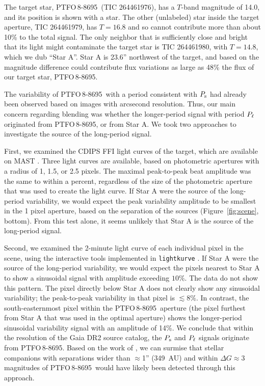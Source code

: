 \documentclass[12pt,twocolumn,tighten]{aastex62}
\newcommand{\ptfo}{PTFO$\,$8-8695}
\begin{document}
The target star, \ptfo\ (TIC 264461976), has a $T$-band magnitude of
14.0, and its position is shown with a star.  The other (unlabeled)
star inside the target aperture, TIC 264461979, has $T=16.8$ and so
cannot contribute more than about 10\% to the total signal.  The only
neighbor that is sufficiently close and bright that its light might
contaminate the target star is TIC 264461980, with $T=14.8$, which we
dub ``Star A''.  Star A is 23.6'' northwest of the target, and based
on the magnitude difference could contribute flux variations as large
as 48\% the flux of our target star, \ptfo.  

The variability of \ptfo\ with a period consistent with $P_{\rm s}$
had already been observed based on images with arcsecond resolution.
Thus, our main concern regarding blending was whether the
longer-period signal with period $P_{\rm \ell}$ originated from \ptfo,
or from Star A. We took two approaches to investigate the source of
the long-period signal.

First, we examined the CDIPS FFI light curves of the target, which are
available on MAST \citep{bouma_cluster_2019}. Three light curves are
available, based on photometric apertures with a radius of 1, 1.5, or
2.5 pixels. The maximal peak-to-peak beat amplitude was the same to
within a percent, regardless of the size of the photometric aperture
that was used to create the light curve.  If Star A were the source of
the long-period variability, we would expect the peak variability
amplitude to be smallest in the 1 pixel aperture, based on the
separation of the sources (Figure~\ref{fig:scene}, bottom).  From this
test alone, it seems unlikely that Star A is the source of the
long-period signal.

Second, we examined the 2-minute light curve of each individual pixel
in the scene, using the interactive tools implemented in
\texttt{lightkurve} \citep{lightkurve_2018}.  If Star A were the
source of the long-period variability, we would expect the pixels
nearest to Star A to show a sinusoidal signal with amplitude exceeding
$10\%$.  The data do not show this pattern.  The pixel directly below
Star A does not clearly show any sinusoidal variability; the
peak-to-peak variability in that pixel is $\lesssim 8\%$.  In
contrast, the south-easternmost pixel within the \ptfo\ aperture (the
pixel furthest from Star A that was used in the optimal aperture)
shows the longer-period sinusoidal variability signal with an
amplitude of 14\%.  We conclude that within the resolution of the Gaia
DR2 source catalog, the $P_{\rm s}$ and $P_{\rm \ell}$ signals
originate from \ptfo.  Based on the work of
\citet{ziegler_measuring_2018}, we can surmise that stellar companions
with separations wider than $\approx$1'' (349~AU) and within $\Delta G
\approx 3$ magnitudes of \ptfo\ would have likely been detected
through this approach. 
\end{document}

